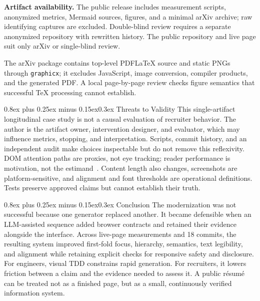 \documentclass[9pt,twocolumn]{extarticle}
\makeatletter
\renewcommand{\section}{\@startsection{section}{1}{0pt}%
  {0.8ex plus 0.25ex minus 0.15ex}{0.3ex}%
  {\normalfont\large\bfseries\color{accent}}}
\makeatother
\begin{document}
\textbf{Artifact availability.} The public release includes measurement scripts, anonymized metrics, Mermaid sources, figures, and a minimal arXiv archive; raw identifying captures are excluded. Double-blind review requires a separate anonymized repository with rewritten history. The public repository and live page suit only arXiv or single-blind review.

The arXiv package contains top-level PDFLaTeX source and static PNGs through \texttt{graphicx}; it excludes JavaScript, image conversion, compiler products, and the generated PDF. A local page-by-page review checks figure semantics that successful TeX processing cannot establish.

\section{Threats to Validity}
This single-artifact longitudinal case study is not a causal evaluation of recruiter behavior. The author is the artifact owner, intervention designer, and evaluator, which may influence metrics, stopping, and interpretation. Scripts, commit history, and an independent audit make choices inspectable but do not remove this reflexivity. DOM attention paths are proxies, not eye tracking; reader performance is motivation, not the estimand~\cite{bishop2026}. Content length also changes, screenshots are platform-sensitive, and alignment and font thresholds are operational definitions. Tests preserve approved claims but cannot establish their truth.

\section{Conclusion}
The modernization was not successful because one generator replaced another. It became defensible when an LLM-assisted sequence added browser contracts and retained their evidence alongside the interface. Across live-page measurements and 18 commits, the resulting system improved first-fold focus, hierarchy, semantics, text legibility, and alignment while retaining explicit checks for responsive safety and disclosure. For engineers, visual TDD constrains rapid generation. For recruiters, it lowers friction between a claim and the evidence needed to assess it. A public r\'esum\'e can be treated not as a finished page, but as a small, continuously verified information system.
\end{document}
